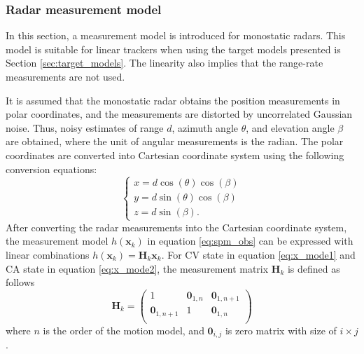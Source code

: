 \documentclass[english, 12pt, a4paper, elec, utf8, a-1b, online]{aaltothesis}
\numberwithin{equation}{section}
\renewcommand{\vec}[1]{\mathbf{#1}}
\newcommand{\x}{\vec{x}_k}
\newcommand{\omodel}{\vec{H}_k}
\begin{document}
\subsubsection{Radar measurement model} \label{sec:measurement_model}

In this section, a measurement model is introduced for monostatic radars.
This model is suitable for linear trackers when using the target models presented is Section \ref{sec:target_models}.
The linearity also implies that the range-rate measurements are not used.

It is assumed that the monostatic radar obtains the position measurements in polar coordinates, and the measurements are distorted by uncorrelated Gaussian noise.
Thus, noisy estimates of range $d$, azimuth angle $\theta$, and elevation angle $\beta$ are obtained, where the unit of angular measurements is the radian. 
The polar coordinates are converted into Cartesian coordinate system using the following conversion equations:
\begin{equation}
\left\{
\begin{array}{l}
    x = d \cos(\theta) \cos(\beta) \\
    y = d \sin(\theta) \cos(\beta) \\
    z = d \sin(\beta).
\end{array}\right.
\end{equation}
After converting the radar measurements into the Cartesian coordinate system, the measurement model $h(\x)$ in equation \eqref{eq:spm_obs} can be expressed with linear combinations $h(\x) = \omodel \x$.
For CV state in equation \eqref{eq:x_mode1} and CA state in equation \eqref{eq:x_mode2}, the measurement matrix $\omodel$ is defined as follows
\begin{equation}\label{eq:position_measurement_matrix}
    \omodel = 
       \begin{pmatrix}
            1 & \vec{0}_{1, n} & \vec{0}_{1, n+1}\\ 
            \vec{0}_{1, n+1} & 1 & \vec{0}_{1, n}\\ 
        \end{pmatrix}
\end{equation}
where $n$ is the order of the motion model, and $\vec{0}_{i,j}$ is zero matrix with size of $i\times j$.
\end{document}

